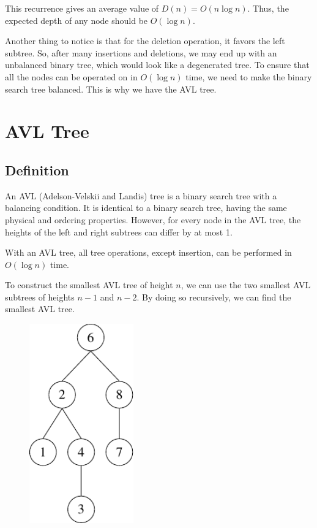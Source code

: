 This recurrence gives an average value of \(D(n) = O(n\log n)\). Thus, the expected depth of any node should be \(O(\log n)\).

Another thing to notice is that for the deletion operation, it favors the left subtree. So, after many insertions and deletions, we may end up with an unbalanced binary tree, which would look like a degenerated tree. To ensure that all the nodes can be operated on in \(O(\log n)\) time, we need to make the binary search tree balanced. This is why we have the AVL tree.

\section{AVL Tree}
\subsection{Definition}
\begin{minipage}{0.7\textwidth}
An AVL (Adelson-Velskii and Landis) tree is a binary search tree with a balancing condition. It is identical to a binary search tree, having the same physical and ordering properties. However, for every node in the AVL tree, the heights of the left and right subtrees can differ by at most 1.

With an AVL tree, all tree operations, except insertion, can be performed in \(O(\log n)\) time.

To construct the smallest AVL tree of height \(n\), we can use the two smallest AVL subtrees of heights \(n-1\) and \(n-2\). By doing so recursively, we can find the smallest AVL tree.
\end{minipage}
\begin{minipage}{0.3\textwidth}
  \begin{figure}[H]
    \centering
    \includegraphics[width=0.4\textwidth]{Figure/AVL.pdf}
  \end{figure}
\end{minipage}

